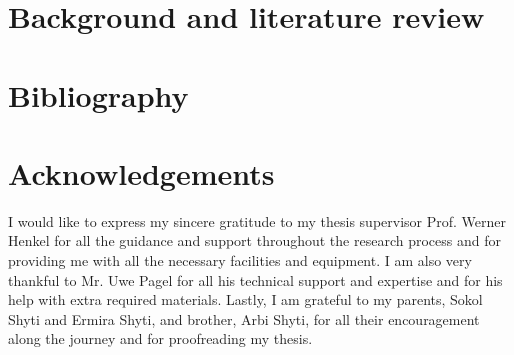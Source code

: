 \documentclass[a4paper,11pt,oneside]{article}
\begin{document}
\newpage
\section{Background and literature review}












\newpage
\section*{Bibliography}
\printbibliography


\newpage
\section*{Acknowledgements}

I would like to express my sincere gratitude to my thesis supervisor Prof. Werner Henkel for all the guidance and support throughout the research process and for providing me with all the necessary facilities and equipment. I am also very thankful to Mr. Uwe Pagel for all his technical support and expertise and for his help with extra required materials. Lastly, I am grateful to my parents, Sokol Shyti and Ermira Shyti, and brother, Arbi Shyti, for all their encouragement along the journey and for proofreading my thesis.
\end{document}
